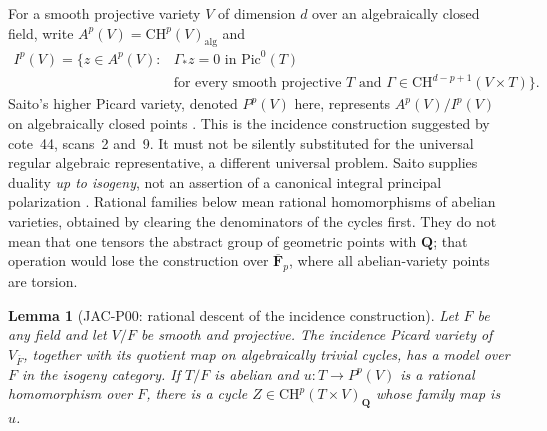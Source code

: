 \documentclass[11pt,a4paper]{article}
\newtheorem{lemma}[theorem]{Lemma}
\begin{document}
For a smooth projective variety $V$ of dimension $d$ over an algebraically
closed field, write $A^p(V)=\mathrm{CH}^p(V)_{\mathrm{alg}}$ and
\[
\begin{split}
 I^p(V)=\{z\in A^p(V):{}&\Gamma_*z=0\text{ in }\mathrm{Pic}^0(T)\\
 &\text{for every smooth projective }T\text{ and }
 \Gamma\in\mathrm{CH}^{d-p+1}(V\times T)\}.
\end{split}
\]
Saito's higher Picard variety, denoted $P^p(V)$ here, represents
$A^p(V)/I^p(V)$ on algebraically closed points
\cite[Theorem~(3.6)(i)]{Saito1979}.
This is the incidence construction suggested by cote~44, scans~2 and~9.
It must not be silently substituted for the universal regular algebraic
representative, a different universal problem.  Saito supplies duality
\emph{up to isogeny}, not an assertion of a canonical integral principal
polarization \cite[Proposition~(4.4)]{Saito1979}.
Rational families below mean rational homomorphisms of abelian varieties,
obtained by clearing the denominators of the cycles first.  They do not
mean that one tensors the abstract group of geometric points with
$\mathbf Q$; that operation would lose the construction over
$\overline{\mathbf F}_p$, where all abelian-variety points are torsion.

\begin{lemma}[JAC-P00: rational descent of the incidence construction]
\label{jac:P00}
Let $F$ be any field and let $V/F$ be smooth and projective.  The
incidence Picard variety of $V_{\overline F}$, together with its quotient
map on algebraically trivial cycles, has a model over $F$ in the isogeny
category.  If $T/F$ is abelian and $u:T\to P^p(V)$ is a rational
homomorphism over $F$, there is a cycle
$Z\in\mathrm{CH}^p(T\times V)_{\mathbf Q}$ whose family map is $u$.
\end{lemma}
\end{document}

